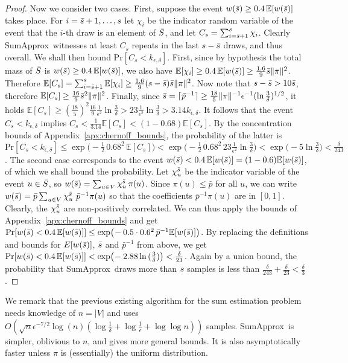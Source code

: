 \documentclass[a4paper,11pt]{article}
\newcommand{\E}{\mathbb{E}}
\newcommand{\prob}{\text{Pr}}
\newcommand{\sumest}{SumApprox}
\newcommand{\kerr}{k_{\epsilon,\delta}}
\begin{document}
\begin{proof}
Now we consider two cases.
First, suppose the event $w(\myss) \ge 0.4\,\E[w(\myss)]$ takes place.
For $i=\bar{s}+1,\ldots,s$ let $\chi_i$ be the indicator random variable of the event that the $i$-th draw is an element of $\bar{S}$, and let $C_s = \sum_{i=\bar{s}+1}^{s}\chi_i$.
Clearly \sumest\ witnesses at least $C_s$ repeats in the last $s - \bar{s}$ draws, and thus overall.
We shall then bound $\prob[C_s < \kerr]$.
First, since by hypothesis the total mass of $\bar{S}$ is $w(\myss) \ge 0.4\, \E[w(\myss)]$, we also have $\E[\chi_i] \ge 0.4\, \E[w(\myss)] \ge \frac{1.6}{9} \myss \|\pi\|^2$.
Therefore $\E[C_s] =  \sum_{i=\myss+1}^{\mys}\E[\chi_i] \ge \frac{1.6}{9}(\mys-\myss) \myss \|\pi\|^2$.
Now note that $s-\bar{s} > 10 \bar{s}$, therefore $\E[C_s] \ge \frac{16}{9} \myss^2 \|\pi\|^2$.
Finally, since $\bar{s} = \lceil \bar{p}^{-1} \rceil \ge \frac{18}{5} \|\pi\|^{-1} \epsilon^{-1} (\ln{\frac{3}{\delta}})^{1/2}$, it holds $\E[C_s] \ge (\frac{18}{5})^2\frac{16}{9}\frac{1}{\epsilon^{2}}\ln{\frac{3}{\delta}} > 23 \frac{1}{\epsilon^{2}}\ln{\frac{3}{\delta}} > 3.14\kerr$.
It follows that the event $C_s < \kerr$ implies $C_s < \frac{1}{3.14}\E[C_s] < (1-0.68)\E[C_s]$.
By the concentration bounds of Appendix~\ref{apx:chernoff_bounds}, the probability of the latter is $\prob[C_s < \kerr] \le \exp{\!\big(\!-\!\frac{1}{2}\,0.68^2\,\E[C_s] \big)} < \exp{\!\big(\!-\frac{1}{2} \, 0.68^2 \, 23 \frac{1}{\epsilon^{2}}\ln{\frac{3}{\delta}}\big)} < \exp{\!\big(\!-\!5\ln{\frac{3}{\delta}} \big)}  < \frac{\delta}{243}$.
The second case corresponds to the event $w(\myss) < 0.4 \, \E[w(\myss)] = (1-0.6)\E[w(\myss)]$, of which we shall bound the probability.
Let $\chi_u^{\bar{s}}$ be the indicator variable of the event $u \in \bar{S}$, so $w(\bar{s}) = \sum_{u \in V} \chi_u^{\bar{s}} \, \pi(u)$.
Since $\pi(u) \le \bar{p}$ for all $u$, we can write $w(\bar{s}) = \bar{p} \sum_{u \in V} \chi_u^{\bar{s}} \,\,\bar{p}^{-1}\pi(u)$ so that the coefficients $\bar{p}^{-1}\pi(u)$ are in $[0,1]$.
Clearly, the $\chi_u^{\bar{s}}$ are non-positively correlated.
We can thus apply the bounds of Appendix~\ref{apx:chernoff_bounds} and get $\prob[w(\myss) < 0.4\, \E[w(\myss)]] \le \exp{\!\big(\!- 0.5 \cdot 0.6^2 \, \bar{p}^{-1}\E[w(\myss)] \big)}$.
By replacing the definitions and bounds for $E[w(\bar{s})]$, $\bar{s}$ and $\bar{p}^{-1}$ from above, we get $\prob[w(\myss) < 0.4\, \E[w(\myss)]] < \exp{\!\big(\!- 2.88 \ln{(\frac{3}{\delta})} \big)} < \frac{\delta}{23}$.
Again by a union bound, the probability that \sumest\ draws more than $s$ samples is less than $\frac{\delta}{243} + \frac{\delta}{23} < \frac{\delta}{3}$.
\end{proof}
We remark that the previous existing algorithm for the sum estimation problem~\cite{Motwani&2007} needs knowledge of $n = |V|$ and uses $O(\sqrt{n} \epsilon^{-7/2} \log(n)(\log{\frac{1}{\delta}} + \log{\frac{1}{\epsilon}} + \log\log{n}))$ samples.
\sumest\ is simpler, oblivious to $n$, and gives more general bounds.
It is also asymptotically faster unless $\pi$ is (essentially) the uniform distribution.
\end{document}
